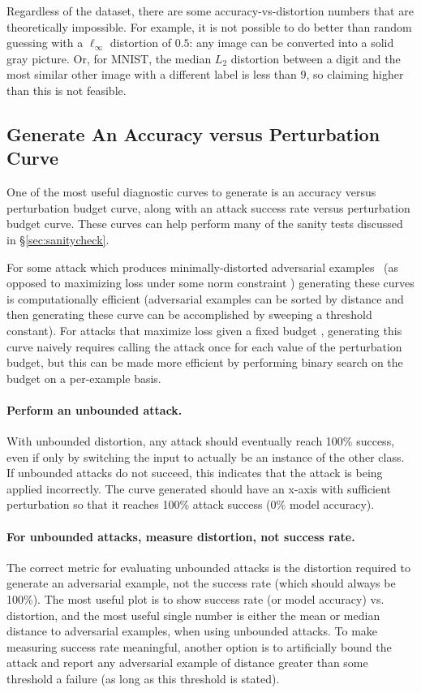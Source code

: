 \documentclass{article} %
\begin{document}
Regardless of the dataset, there are some accuracy-vs-distortion
numbers that are theoretically impossible.
%
For example, it is not
possible to do better than random guessing with a $\ell_\infty$
distortion of $0.5$: any image can be converted into a solid gray
picture.
%
Or, for MNIST, the median $L_2$ distortion between a
digit and the most similar other image with a different label
is less than $9$, so claiming higher than this is not feasible.

\subsection{Generate An Accuracy versus Perturbation Curve}
\label{sec:100success}

One of the most useful diagnostic curves to generate is an accuracy versus perturbation budget
curve, along with an attack success rate versus perturbation budget curve.
%
These curves can help perform many of the sanity tests discussed in \S\ref{sec:sanitycheck}.

For some attack which produces minimally-distorted adversarial
examples~\citep{carlini2017towards} (as opposed to maximizing loss
under some norm constraint \citep{madry2017towards})
generating these curves is computationally efficient
(adversarial examples can be sorted by distance and then generating these curve
can be accomplished by sweeping a threshold constant).
%
For attacks that maximize loss given a fixed budget \citep{madry2017towards},
generating this curve naively requires calling the attack once for each value
of the perturbation budget, but this can be made more efficient by performing
binary search on the budget on a per-example basis.


\paragraph{Perform an unbounded attack.}
With unbounded
distortion, any attack should eventually reach 100\% success, even if only
by switching the input to actually be an instance of the other class.
%
If unbounded attacks do not succeed, this indicates that the attack is
being applied incorrectly.
%
The curve generated should have an x-axis with sufficient perturbation
so that it reaches 100\% attack success (0\% model accuracy).

\paragraph{For unbounded attacks, measure distortion, not success rate.}
%
The correct metric for evaluating unbounded attacks is the distortion
required to generate an adversarial example, not the success rate
(which should always be 100\%).
%
The most useful plot is to show success rate (or model accuracy) vs. distortion,
and the most useful single number is
either the mean or median distance to adversarial examples, when using
unbounded attacks.
%
To make measuring success rate meaningful, another
option is to artificially bound the attack and report any adversarial
example of distance greater than some threshold a failure (as long as
this threshold is stated).
\end{document}
